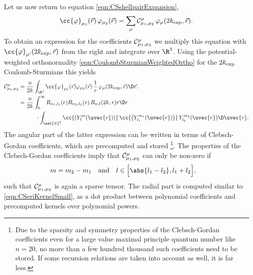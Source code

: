 \noindent
Let us now return to equation \eqref{eqn:CSshellpairExpansion}, \ie
\[
	\cc{\varphi}_{\mu_1}(\vec{r}) \, \varphi_{\mu_2}(\vec{r})
	= \sum_{\mu} \csC^\mu_{\mu_1,\mu_2} \, \varphi_{\mu}(2\kexp, \vec{r}).
\]
To obtain an expression for the coefficients $\mathcal{C}^\mu_{\mu_1,\mu_2}$
we multiply this equation with
$\cc{\varphi}_{\mu'}(2\kexp, \vec{r})$
from the right and integrate over $\R^3$.
Using the potential-weighted orthonormality \eqref{eqn:CoulombSturmianWeightedOrtho}
for the $2k_\text{exp}$ Coulomb-Sturmians
this yields
\begin{equation}
	\begin{aligned}
	\csC^\mu_{\mu_1,\mu_2}
	&= \frac{n}{2k}
	\int_{\R^3}
	\cc{\varphi}_{\mu_1}(\vec{r}) \varphi_{\mu_2}(\vec{r}) \,
		\frac{1}{r} \, \varphi_{\mu}(2\kexp, \vec{r})
	\D \vec{r}. \\
	&= \frac{n}{2k}
		\int_0^\infty R_{n_1,l_1}(r) R_{n_2,l_2}(r) \, R_{n,l}(2k, r) r \D r \\
	&\hspace{30pt}
		\cdot \int_{\set{S}^2}
			\cc{\left(Y_l^m(\uvec{r})\right)} \,
			\cc{\left(Y_{l_1}^{m_1}(\uvec{r})\right)} \,
			Y_{l_2}^{m_2}(\uvec{r})
		\D \uvec{r}.
	\end{aligned}
	\label{eqn:CScoefficientExpression}
\end{equation}
The angular part of the latter expression can be written in terms of
Clebsch-Gordan coefficients, which are precomputed and stored%
\footnote{Due to the sparsity and symmetry properties
	of the Clebsch-Gordan coefficients even for a large value
	maximal principle quantum number like $n=20$,
	no more than a few
	hundred thousand such coefficients need to be stored.
	If some recursion relations are taken into account as well,
	it is far less.
}.
The properties of the Clebsch-Gordan coefficients imply that
$\mathcal{C}^\mu_{\mu_1,\mu_2}$ can only be non-zero if
\begin{align*}
	m &= m_2 - m_1 &&\text{and}&
	l &\in \Big[\abs{l_1-l_2}, l_1+l_2\Big],
\end{align*}
such that $\mathcal{C}^\mu_{\mu_1,\mu_2}$ is again a sparse tensor.
The radial part is computed similar to \eqref{eqn:CSeriKernelSmall},
\ie as a dot product between polynomial coefficients
and precomputed kernels over polynomial powers.

